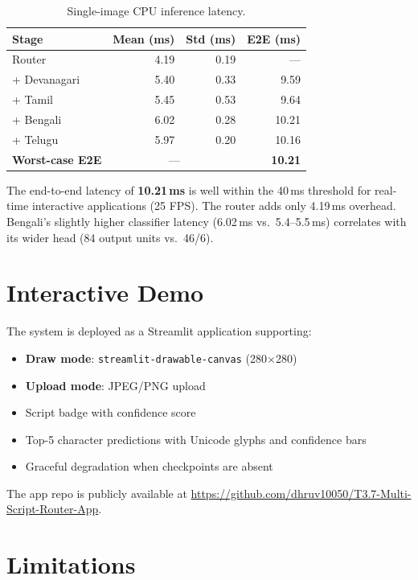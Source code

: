 \documentclass[10pt,twocolumn]{article}
\begin{document}
\begin{table}[H]
\centering
\caption{Single-image CPU inference latency.}
\label{tab:latency}
\small
\begin{tabular}{lrrr}
\toprule
Stage & Mean (ms) & Std (ms) & E2E (ms) \\
\midrule
Router          & 4.19 & 0.19 & — \\
+ Devanagari    & 5.40 & 0.33 & 9.59 \\
+ Tamil         & 5.45 & 0.53 & 9.64 \\
+ Bengali       & 6.02 & 0.28 & 10.21 \\
+ Telugu        & 5.97 & 0.20 & 10.16 \\
\midrule
\textbf{Worst-case E2E} & \multicolumn{2}{c}{—} & \textbf{10.21} \\
\bottomrule
\end{tabular}
\end{table}

The end-to-end latency of \textbf{10.21\,ms} is well within the 40\,ms
threshold for real-time interactive applications (25 FPS).  The router adds
only 4.19\,ms overhead.  Bengali's slightly higher classifier latency (6.02\,ms
vs.\ 5.4--5.5\,ms) correlates with its wider head (84 output units vs.\ 46/6).

\section{Interactive Demo}

The system is deployed as a Streamlit application supporting:
\begin{itemize}[noitemsep,leftmargin=*]
  \item \textbf{Draw mode}: \texttt{streamlit-drawable-canvas} (280$\times$280)
  \item \textbf{Upload mode}: JPEG/PNG upload
  \item Script badge with confidence score
  \item Top-5 character predictions with Unicode glyphs and confidence bars
  \item Graceful degradation when checkpoints are absent
\end{itemize}
The app repo is publicly available at
{\small\url{https://github.com/dhruv10050/T3.7-Multi-Script-Router-App}}.

\section{Limitations}
\end{document}
